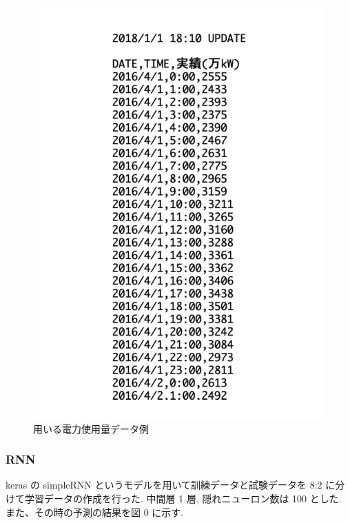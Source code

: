 \begin{figure}[hb]
\centering
\includegraphics[scale=0.5]{exe_csv.pdf}
 \caption{用いる電力使用量データ例}
\end{figure}

\subsubsection{RNN}
keras の simpleRNN というモデルを用いて訓練データと試験データを 8:2 に分けて学習データの作成を行った. 中間層 1 層, 隠れニューロン数は 100 とした. また、その時の予測の結果を図 0 に示す.


